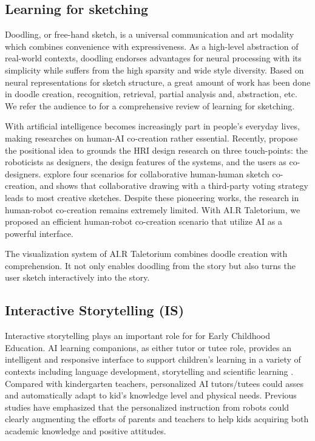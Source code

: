 \subsection{Learning for sketching}
Doodling, or free-hand sketch, is a universal communication and art modality which combines convenience with expressiveness. As a high-level abstraction of real-world contexts, doodling endorses advantages for neural processing with its simplicity while suffers from the high sparsity and wide style diversity. Based on neural representations for sketch structure\cite{Ha2018ANR,Ribeiro2020SketchformerTR}, a great amount of work has been done in doodle creation, recognition, retrieval, partial analysis and, abstraction, etc. We refer the audience to\cite{Xu2020DeepLF} for a comprehensive review of learning for sketching. 

With artificial intelligence becomes increasingly part in people’s everyday lives, making researches on human-AI co-creation rather essential. Recently, \cite{Ostrowski2020DesignRI} propose the positional idea to grounds the HRI design research on three touch-points: the roboticists as designers, the design features of the systems, and the users as co-designers. \cite{Parikh2020ExploringCC} explore four scenarios for collaborative human-human sketch co-creation, and shows that collaborative drawing with a third-party voting strategy leads to most creative sketches. Despite these pioneering works, the research in human-robot co-creation remains extremely limited. With AI.R Taletorium, we proposed an efficient human-robot co-creation scenario that utilize AI as a powerful interface.

The visualization system of AI.R Taletorium combines doodle creation with comprehension. It not only enables doodling from the story but also turns the user sketch interactively into the story.

\subsection{Interactive Storytelling (IS)}
Interactive storytelling plays an important role for for Early Childhood Education. AI learning companions, as either tutor or tutee role, provides an intelligent and responsive interface to support children’s learning in a variety of contexts including language development, storytelling and scientific learning \cite{Kanda2004InteractiveRA,Park2019AMA,Park2017TellingST,Gordon2016AffectivePO,Chen2020ImpactOI}. Compared with kindergarten teachers, personalized AI tutors/tutees could asses and automatically adapt to kid's knowledge level and physical needs. Previous studies\cite{Belpaeme2018SocialRF,Park2019AMA,Maeda2019CanAS} have emphasized that the personalized instruction from robots could clearly augmenting the efforts of parents and teachers to help kids acquiring both academic knowledge and positive attitudes. 

